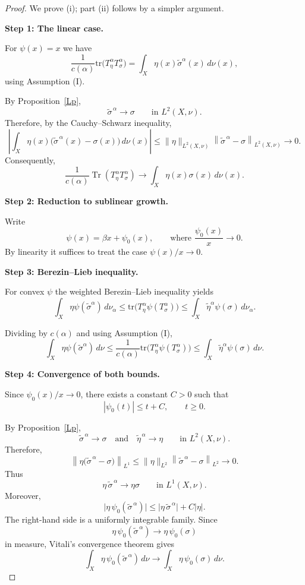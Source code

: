 \documentclass{amsart}
\theoremstyle{definition}
\theoremstyle{remark}
\numberwithin{equation}{section}
\newcommand{\tr}{\text{tr}} %
\newcommand{\calF}{\mathcal{F}}
\begin{document}
\begin{proof} We prove (i); part (ii) follows by a simpler argument.

\medskip
\noindent
\textbf{Step 1: The linear case.}

For $\psi(x)=x$ we have
\[
\frac{1}{c(\alpha)}
\tr\!\big(T_\eta^\alpha T_\sigma^\alpha\big)
=
\int_X \eta(x)\widetilde{\sigma}^\alpha(x)\, d\nu(x),
\]
using Assumption (I).

By Proposition~\ref{Lp},
\[
\widetilde{\sigma}^{\,\alpha}\longrightarrow\sigma
\qquad\text{in }L^2(X,\nu).
\]
Therefore, by the Cauchy--Schwarz inequality,
\[
\left|
\int_X\eta(x)
\bigl(\widetilde{\sigma}^{\,\alpha}(x)-\sigma(x)\bigr)
\,d\nu(x)
\right|
\leq
\|\eta\|_{L^2(X,\nu)}
\left\|
\widetilde{\sigma}^{\,\alpha}-\sigma
\right\|_{L^2(X,\nu)}
\longrightarrow 0.
\]
Consequently,
\[
\frac{1}{c(\alpha)}
\operatorname{Tr}\!\left(
T_\eta^\alpha T_\sigma^\alpha
\right)
\longrightarrow
\int_X\eta(x)\sigma(x)\,d\nu(x).
\]

\medskip
\noindent
\textbf{Step 2: Reduction to sublinear growth.}

Write
\[
\psi(x)=\beta x + \psi_0(x),
\qquad
\text{where } \frac{\psi_0(x)}{x}\to 0.
\]
By linearity it suffices to treat the case
$\psi(x)/x\to 0$.

\medskip
\noindent
\textbf{Step 3: Berezin--Lieb inequality.}

For convex $\psi$ the weighted Berezin--Lieb inequality yields
\[
\int_X \eta \psi(\widetilde{\sigma}^\alpha)\, d\nu_\alpha
\le
\tr\!\big(T_\eta^\alpha \psi(T_\sigma^\alpha)\big)
\le
\int_X \widetilde{\eta}^\alpha \psi(\sigma)\, d\nu_\alpha.
\]

Dividing by $c(\alpha)$ and using Assumption (I),
\[
\int_X \eta \psi(\widetilde{\sigma}^\alpha)\, d\nu
\le
\frac{1}{c(\alpha)}
\tr\!\big(T_\eta^\alpha \psi(T_\sigma^\alpha)\big)
\le
\int_X \widetilde{\eta}^\alpha \psi(\sigma)\, d\nu.
\]

\medskip

\noindent\textbf{Step 4: Convergence of both bounds.}

Since $\psi_0(x)/x\to0$, there exists a constant $C>0$ such that
\[
|\psi_0(t)|\leq t+C,
\qquad t\geq0.
\]

By Proposition~\ref{Lp},
\[
\widetilde{\sigma}^{\,\alpha}\to\sigma
\quad\text{and}\quad
\widetilde{\eta}^{\,\alpha}\to\eta
\qquad\text{in }L^2(X,\nu).
\]
Therefore,
\[
\left\|
\eta\bigl(\widetilde{\sigma}^{\,\alpha}-\sigma\bigr)
\right\|_{L^1}
\leq
\|\eta\|_{L^2}
\left\|
\widetilde{\sigma}^{\,\alpha}-\sigma
\right\|_{L^2}
\longrightarrow0.
\]
Thus
\[
\eta\,\widetilde{\sigma}^{\,\alpha}
\longrightarrow
\eta\sigma
\qquad\text{in }L^1(X,\nu).
\]
Moreover,
\[
\bigl|\eta\,\psi_0(\widetilde{\sigma}^{\,\alpha})\bigr|
\leq
\bigl|\eta\,\widetilde{\sigma}^{\,\alpha}\bigr|+C\bigl|\eta\bigr|.
\]
The right-hand side is a uniformly integrable family. Since
\[
\eta\,\psi_0(\widetilde{\sigma}^{\,\alpha})
\longrightarrow
\eta\,\psi_0(\sigma)
\]
in measure, Vitali's convergence theorem gives
\[
\int_X
\eta\,\psi_0(\widetilde{\sigma}^{\,\alpha})\,d\nu
\longrightarrow
\int_X\eta\,\psi_0(\sigma)\,d\nu.
\]


\end{proof}
\end{document}
